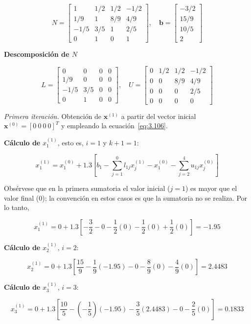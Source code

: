 \documentclass[12pt,letterpaper]{article}
\theoremstyle{definition}
\theoremstyle{plain}
\theoremstyle{remark}
\begin{document}
\[
N =
\begin{bmatrix}
1 & 1/2 & 1/2 & -1/2 \\
1/9 & 1 & 8/9 & 4/9 \\
-1/5 & 3/5 & 1 & 2/5 \\
0 & 1 & 0 & 1
\end{bmatrix},
\quad
\mathbf{b} =
\begin{bmatrix}
-3/2 \\
15/9 \\
10/5 \\
2
\end{bmatrix}
\]

\textbf{Descomposición de $N$}

\[
L =
\begin{bmatrix}
0 & 0 & 0 & 0 \\
1/9 & 0 & 0 & 0 \\
-1/5 & 3/5 & 0 & 0 \\
0 & 1 & 0 & 0
\end{bmatrix},
\quad
U =
\begin{bmatrix}
0 & 1/2 & 1/2 & -1/2 \\
0 & 0 & 8/9 & 4/9 \\
0 & 0 & 0 & 2/5 \\
0 & 0 & 0 & 0
\end{bmatrix}
\]

\textit{Primera iteración.} Obtención de $\mathbf{x}^{(1)}$ a partir del vector inicial $\mathbf{x}^{(0)} = [0\ 0\ 0\ 0]^T$ y empleando la ecuación~\eqref{eq:3.106}.

\textbf{Cálculo de } $x_1^{(1)}$, esto es, $i = 1$ y $k+1 = 1$:

\[
x_1^{(1)} = x_1^{(0)} + 1.3 \left[ b_1 - \sum_{j=1}^{0} l_{1j} x_j^{(1)} - x_1^{(0)} - \sum_{j=2}^{4} u_{1j} x_j^{(0)} \right]
\]

Obsérvese que en la primera sumatoria el valor inicial ($j=1$) es mayor que el valor final ($0$); la convención en estos casos es que la sumatoria no se realiza. Por lo tanto,

\[
x_1^{(1)} = 0 + 1.3 \left[ -\frac{3}{2} - 0 - \frac{1}{2}(0) - \frac{1}{2}(0) + \frac{1}{2}(0) \right] = -1.95
\]

\textbf{Cálculo de } $x_2^{(1)}$, $i = 2$:

\[
x_2^{(1)} = 0 + 1.3 \left[ \frac{15}{9} - \frac{1}{9}(-1.95) - 0 - \frac{8}{9}(0) - \frac{4}{9}(0) \right] = 2.4483
\]

\textbf{Cálculo de } $x_3^{(1)}$, $i = 3$:

\[
x_3^{(1)} = 0 + 1.3 \left[ \frac{10}{5} - (-\frac{1}{5})(-1.95) - \frac{3}{5}(2.4483) - 0 - \frac{2}{5}(0) \right] = 0.1833
\]
\end{document}
